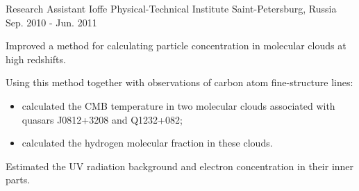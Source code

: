 \begin{cventries}
  \cventry
    {Research Assistant} %
    {Ioffe Physical-Technical Institute} %
    {Saint-Petersburg, Russia} %
    {Sep. 2010 - Jun. 2011} %
    {
      \begin{cvitems} %
        \item {Improved a method for calculating particle concentration in molecular clouds at high redshifts.}
        \item {Using this method together with observations of carbon atom fine-structure lines:}
            \begin{itemize}
                \item {calculated the CMB temperature in two molecular clouds associated with quasars J0812+3208 and Q1232+082;}
                \item {calculated the hydrogen molecular fraction in these clouds.}
            \end{itemize}
        \item {Estimated the UV radiation background and electron concentration in their inner parts.}
      \end{cvitems}
    }

\end{cventries}
